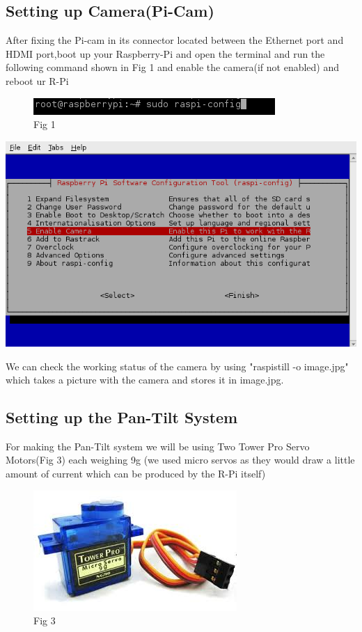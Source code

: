 \documentclass[a4paper,12pt,oneside]{book}
\begin{document}
		\subsection{Setting up Camera(Pi-Cam)}
		After fixing the Pi-cam in its connector located between the Ethernet port and HDMI port,boot up your Raspberry-Pi and open the terminal and run the following command shown in Fig 1 and enable the camera(if not enabled) and reboot ur R-Pi 
	    \begin{figure}[h!]
         \includegraphics[scale=0.6]{cmd.png}
         \centering
         \caption{Fig 1}
        \end{figure}
		 
	   	\begin{center}
         \includegraphics[scale=0.6]{enablecam.png}
         \centering
        \end{center}
		\par We can check the working status of the camera by using "raspistill -o image.jpg" which takes a picture with the camera and stores it in image.jpg. 
	
		\subsection{Setting up the Pan-Tilt System}
		For making the Pan-Tilt system we will be using Two Tower Pro Servo Motors(Fig 3) each weighing 9g (we used micro servos as they would draw a little amount of current which can be produced by the R-Pi itself)
		\begin{figure}[h!]
         \includegraphics[scale=0.6]{servo.jpg}
         \centering
         \caption{Fig 3}
        \end{figure}
        
\end{document}
